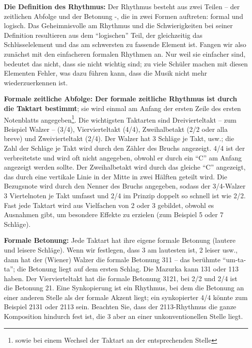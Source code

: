 \textbf{Die Definition des Rhythmus:}
Der Rhythmus besteht aus zwei Teilen -- der zeitlichen Abfolge und der Betonung -, die in zwei Formen auftreten: formal und logisch.
Das Geheimnisvolle am Rhythmus und die Schwierigkeiten bei seiner Definition resultieren aus dem \enquote{logischen} Teil, der gleichzeitig das Schlüsselelement und das am schwersten zu fassende Element ist.
Fangen wir also zunächst mit den einfacheren formalen Rhythmen an.
Nur weil sie einfacher sind, bedeutet das nicht, dass sie nicht wichtig sind; zu viele Schüler machen mit diesen Elementen Fehler, was dazu führen kann, dass die Musik nicht mehr wiederzuerkennen ist.

\textbf{Formale zeitliche Abfolge:
Der formale zeitliche Rhythmus ist durch die Taktart bestimmt}; sie wird einmal am Anfang der ersten Zeile des ersten Notenblatts angegeben\footnote{sowie bei einem Wechsel der Taktart an der entsprechenden Stelle}.
Die wichtigsten Taktarten sind Dreivierteltakt -- zum Beispiel Walzer -- (3/4), Viervierteltakt (4/4), Zweihalbetakt (2/2 oder alla breve) und Zweivierteltakt (2/4).
Der Walzer hat 3 Schläge je Takt, usw.; die Zahl der Schläge je Takt wird durch den Zähler des Bruchs angezeigt. 
4/4 ist der verbreitetste und wird oft nicht angegeben, obwohl er durch ein \enquote{C} am Anfang angezeigt werden sollte.
Der Zweihalbetakt wird durch das gleiche \enquote{C} angezeigt, das durch eine vertikale Linie in der Mitte in zwei Hälften geteilt wird.
Die Bezugsnote wird durch den Nenner des Bruchs angegeben, sodass der 3/4-Walzer 3 Viertelnoten je Takt umfasst und 2/4 im Prinzip doppelt so schnell ist wie 2/2.
Fast jede Taktart wird aus Vielfachen von 2 oder 3 gebildet, obwohl es Ausnahmen gibt, um besondere Effekte zu erzielen (zum Beispiel 5 oder 7 Schläge).

\textbf{Formale Betonung:}
Jede Taktart hat ihre eigene formale Betonung (lautere und leisere Schläge).
Wenn wir festlegen, dass 3 am lautesten ist, 2 leiser usw., dann hat der (Wiener) Walzer die formale Betonung 311 -- das berühmte \enquote{um-ta-ta}; die Betonung liegt auf dem ersten Schlag.
Die Mazurka kann 131 oder 113 haben. 
Der Viervierteltakt hat die formale Betonung 3121, bei 2/2 und 2/4 ist die Betonung 21.
Eine Synkopierung ist ein Rhythmus, bei dem die Betonung an einer anderen Stelle als der formale Akzent liegt; ein synkopierter 4/4 könnte zum Beispiel 2131 oder 2113 sein.
Beachten Sie, dass der 2113-Rhythmus die ganze Komposition hindurch fest ist, die 3 aber an einer unkonventionellen Stelle liegt.

